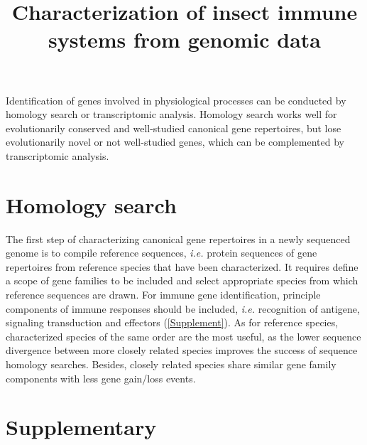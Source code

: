 \documentclass[11pt]{article}
\title{Characterization of insect immune systems from genomic data}
\author{}
\date{}
\begin{document}
  \maketitle

  \linenumbers
Identification of genes involved in physiological processes can be conducted by homology search or transcriptomic analysis. 
Homology search works well for evolutionarily conserved and well-studied canonical gene repertoires, but lose evolutionarily novel or not well-studied genes, which can be complemented by transcriptomic analysis. 

\section{Homology search}
The first step of characterizing canonical gene repertoires in a newly sequenced genome is to compile reference sequences, \textit{i.e.} protein sequences of gene repertoires from reference species that have been characterized. 
It requires define a scope of gene families to be included and select appropriate species from which reference sequences are drawn. 
For immune gene identification, principle components of immune responses should be included, \textit{i.e.} recognition of antigene, signaling transduction and effectors (\ref{Supplement}). 
As for reference species, characterized species of the same order are the most useful, as the lower sequence divergence between more closely related species improves the success of sequence homology searches. 
Besides, closely related species share similar gene family components with less gene gain/loss events. 



\newcommand{\beginsupplement}{%
        \setcounter{table}{0}
        \renewcommand{\thetable}{S\arabic{table}}%
        \setcounter{figure}{0}
        \renewcommand{\thefigure}{S\arabic{figure}}%
     }
\section{Supplementary}
  \beginsupplement
\end{document}
